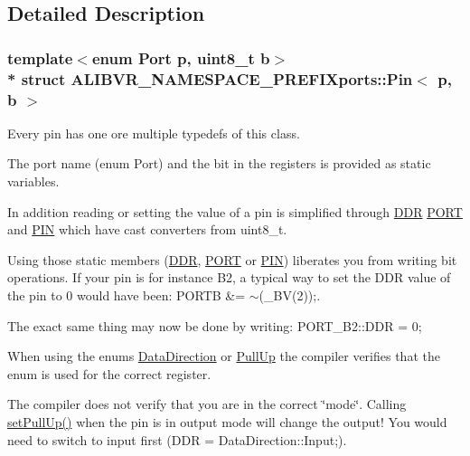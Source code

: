 \subsection{Detailed Description}
\subsubsection*{template$<$enum Port p, uint8\+\_\+t b$>$\\*
struct A\+L\+I\+B\+V\+R\+\_\+\+N\+A\+M\+E\+S\+P\+A\+C\+E\+\_\+\+P\+R\+E\+F\+I\+Xports\+::\+Pin$<$ p, b $>$}

Every pin has one ore multiple typedefs of this class. 

The port name (enum Port) and the bit in the registers is provided as static variables.

In addition reading or setting the value of a pin is simplified through \hyperlink{structALIBVR__NAMESPACE__PREFIXports_1_1Pin_a7a8fd2de2412fd6b900c5f65249ac77b}{D\+DR} \hyperlink{structALIBVR__NAMESPACE__PREFIXports_1_1Pin_a0d296d2ad6858263ef7aff31969a0b2d}{P\+O\+RT} and \hyperlink{structALIBVR__NAMESPACE__PREFIXports_1_1Pin_a76f4ad486feabcd5abf2f3d9afa24650}{P\+IN} which have cast converters from uint8\+\_\+t.

Using those static members (\hyperlink{structALIBVR__NAMESPACE__PREFIXports_1_1Pin_a7a8fd2de2412fd6b900c5f65249ac77b}{D\+DR}, \hyperlink{structALIBVR__NAMESPACE__PREFIXports_1_1Pin_a0d296d2ad6858263ef7aff31969a0b2d}{P\+O\+RT} or \hyperlink{structALIBVR__NAMESPACE__PREFIXports_1_1Pin_a76f4ad486feabcd5abf2f3d9afa24650}{P\+IN}) liberates you from writing bit operations. If your pin is for instance B2, a typical way to set the D\+DR value of the pin to 0 would have been\+: {\ttfamily P\+O\+R\+TB \&= $\sim$(\+\_\+\+B\+V(2));}.

The exact same thing may now be done by writing\+: {\ttfamily P\+O\+R\+T\+\_\+\+B2\+::\+D\+DR = 0;}

When using the enums \hyperlink{namespaceALIBVR__NAMESPACE__PREFIXports_a726f0120b8d4e0856e47f3daf19bd725}{Data\+Direction} or \hyperlink{namespaceALIBVR__NAMESPACE__PREFIXports_ae4be55f1d106e37c89f38c66f674b53a}{Pull\+Up} the compiler verifies that the enum is used for the correct register.

The compiler does not verify that you are in the correct \char`\"{}mode\char`\"{}. Calling \hyperlink{structALIBVR__NAMESPACE__PREFIXports_1_1Pin_a7f2b41510695675bf73fcafe5ca94bda}{set\+Pull\+Up()} when the pin is in output mode will change the output! You would need to switch to input first ({\ttfamily D\+DR = Data\+Direction\+::\+Input;}). 

